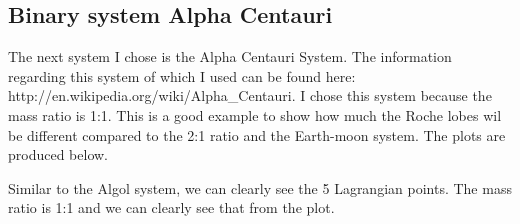\documentclass{article}
\begin{document}
\subsection{Binary system Alpha Centauri}
The next system I chose is the Alpha Centauri System. The information regarding this system of which I used can be found here: http://en.wikipedia.org/wiki/Alpha\_Centauri. I chose this system because the mass ratio is 1:1. This is a good example to show how much the Roche lobes wil be different compared to the 2:1 ratio and the Earth-moon system. The plots are produced below.
\begin{figure}[H]
\end{figure}
Similar to the Algol system, we can clearly see the 5 Lagrangian points. The mass ratio is 1:1 and we can clearly see that from the plot.
\begin{figure}[H]
\end{figure}
\end{document}

